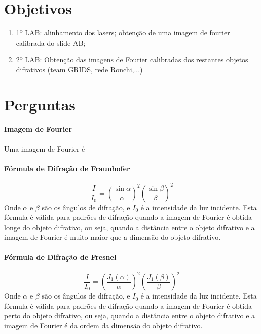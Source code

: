 \documentclass{article}
\begin{document}
\begin{multicols}{2}

\section{Objetivos}

\begin{enumerate}
    \item 1º LAB: alinhamento dos lasers; obtenção de uma imagem de fourier calibrada do slide AB;
    \item 2º LAB: Obtenção das imagens de Fourier calibradas dos restantes objetos difrativos (team GRIDS, rede Ronchi,...)
\end{enumerate}

\section{Perguntas}

\paragraph{Imagem de Fourier} Uma imagem de Fourier é 
\paragraph{Fórmula de Difração de Fraunhofer} 
\[ \frac{I}{I_0} = \left( \frac{\sin \alpha}{\alpha} \right)^2 \left( \frac{\sin \beta}{\beta} \right)^2 \]
Onde $\alpha$ e $\beta$ são os ângulos de difração, e $I_0$ é a intensidade da luz incidente.
Esta fórmula é válida para padrões de difração quando a imagem de Fourier é obtida longe do objeto difrativo, ou seja, quando a distância entre o objeto difrativo e a imagem de Fourier é muito maior que a dimensão do objeto difrativo.

\paragraph{Fórmula de Difração de Fresnel}
\[ \frac{I}{I_0} = \left( \frac{J_1(\alpha)}{\alpha} \right)^2 \left( \frac{J_1(\beta)}{\beta} \right)^2 \]
Onde $\alpha$ e $\beta$ são os ângulos de difração, e $I_0$ é a intensidade da luz incidente.
Esta fórmula é válida para padrões de difração quando a imagem de Fourier é obtida perto do objeto difrativo, ou seja, quando a distância entre o objeto difrativo e a imagem de Fourier é da ordem da dimensão do objeto difrativo.

\end{multicols}
\end{document}
